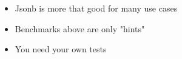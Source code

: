 \documentclass[usenames,dvipsnames, 18pt, compress, aspectratio=169]{beamer}
\begin{document}



\begin{frame}[fragile]
    \frametitle{}
    \vspace{10pt}
    \begin{itemize}[leftmargin=*, label={\MVRightarrow}]
        \item <+-> Jsonb is more that good for many use cases
        \item <+-> Benchmarks above are only "hints"
        \item <+-> You need your own tests
    \end{itemize}
\end{frame}

\end{document}
